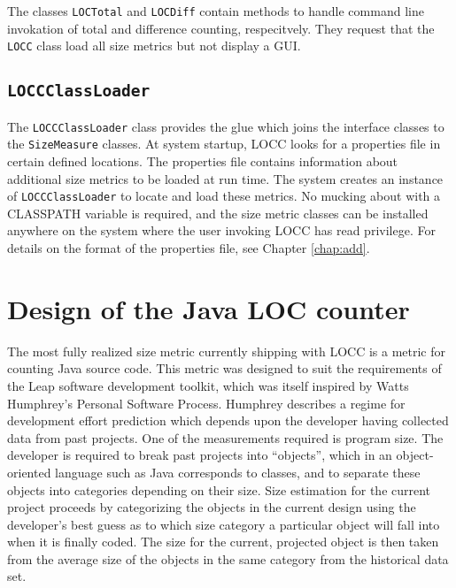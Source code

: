 The classes {\tt LOCTotal} and {\tt LOCDiff} contain methods to handle
command line invokation of total and difference counting, respecitvely.
They request that the {\tt LOCC} class load all size metrics but not
display a GUI.

\subsection{\mbox{\tt LOCCClassLoader}}

The \mbox{\tt LOCCClassLoader} class provides the glue which joins the interface
classes to the \mbox{\tt SizeMeasure} classes.  At system startup, LOCC looks for 
a properties file in certain defined locations.  The properties file
contains information about additional size metrics to be loaded at
run time.  The system creates an instance of \mbox{\tt LOCCClassLoader} to locate
and load these metrics.  No mucking about with a CLASSPATH variable is 
required, and the size metric classes can be installed anywhere on the 
system where the user invoking LOCC has read privilege.  For details on the 
format of the properties file, see Chapter \ref{chap:add}.



\section{Design of the Java LOC counter}

The most fully realized size metric currently shipping with LOCC is a
metric for counting Java source code.  This metric was designed to
suit the requirements of the Leap software development
toolkit\cite{Moore}, which was itself inspired by Watts Humphrey's
Personal Software Process\cite{Humphrey}.  Humphrey describes a regime for development
effort prediction which depends upon the developer having collected
data from past projects.  One of the measurements required is program
size.  The developer is required to break past projects into
``objects'', which in an object-oriented language such as Java
corresponds to classes, and to separate these objects into categories
depending on their size.  Size estimation for the current project
proceeds by categorizing the objects in the current design using the
developer's best guess as to which size category a particular object
will fall into when it is finally coded.  The size for the current,
projected object is then taken from the average size of the objects in 
the same category from the historical data set.

